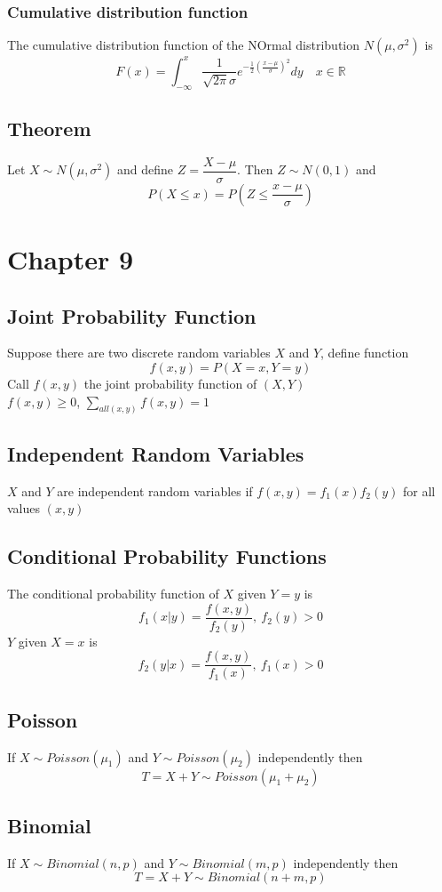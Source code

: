 \documentclass[11pt]{article}
\newcommand{\R}{{\mathbb{R}}}
\begin{document}
\subsubsection{Cumulative distribution function}
The cumulative distribution function of the NOrmal distribution $N(\mu, \sigma^2)$ is 
\[F(x) = \int_{-\infty}^{x}\dfrac{1}{\sqrt{2\pi}\sigma}e^{-\frac{1}{2}(\frac{x-\mu}{\sigma})^2}dy\quad x\in\R\]
\subsection{Theorem}
Let $X\sim N(\mu, \sigma^2)$ and define $Z=\dfrac{X-\mu}{\sigma}$. Then $Z\sim N(0,1)$ and 
\[P(X\leq x) = P(Z\leq \dfrac{x-\mu}{\sigma})\]

\section{Chapter 9}
\subsection{Joint Probability Function}
Suppose there are two discrete random variables $X$ and $Y$, define function 
\[f(x,y) = P(X=x, Y=y)\]
Call $f(x,y)$ the joint probability function of $(X,Y)$ \\
$f(x,y)\geq 0$, $\displaystyle\sum_{all(x,y)}f(x,y) = 1$
\subsection{Independent Random Variables}
$X$ and $Y$ are independent random variables if $f(x,y) = f_1(x)f_2(y)$ for all values $(x,y)$
\subsection{Conditional Probability Functions}
The conditional probability function of $X$ given $Y=y$ is 
\[f_1(x|y) = \dfrac{f(x,y)}{f_2(y)},\ f_2(y)>0\]
$Y$ given $X=x$ is 
\[f_2(y|x) = \dfrac{f(x,y)}{f_1(x)},\ f_1(x)>0\]
\subsection{Poisson}
If $X\sim Poisson(\mu_1)$ and $Y\sim Poisson(\mu_2)$ independently then 
\[T = X+Y\sim Poisson(\mu_1 + \mu_2)\]
\subsection{Binomial}
If $X\sim Binomial(n,p)$ and $Y\sim Binomial(m,p)$ independently then 
\[T = X+Y\sim Binomial(n+m, p)\]
\end{document}
